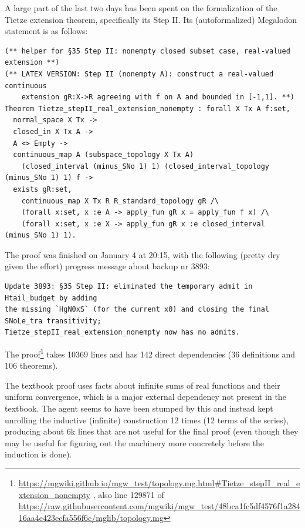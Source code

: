 \documentclass[a4paper,UKenglish,cleveref, autoref, thm-restate]{lipics-v2021}
\begin{document}
A large part of the last two days has been spent on the formalization
of the Tietze extension theorem, specifically its Step II. Its (autoformalized) Megalodon statement is as follows:
\begin{small}
\begin{verbatim}
(** helper for §35 Step II: nonempty closed subset case, real-valued extension **)
(** LATEX VERSION: Step II (nonempty A): construct a real-valued continuous
    extension gR:X->R agreeing with f on A and bounded in [-1,1]. **)
Theorem Tietze_stepII_real_extension_nonempty : forall X Tx A f:set,
  normal_space X Tx ->
  closed_in X Tx A ->
  A <> Empty ->
  continuous_map A (subspace_topology X Tx A)
    (closed_interval (minus_SNo 1) 1) (closed_interval_topology (minus_SNo 1) 1) f ->
  exists gR:set,
    continuous_map X Tx R R_standard_topology gR /\
    (forall x:set, x :e A -> apply_fun gR x = apply_fun f x) /\
    (forall x:set, x :e X -> apply_fun gR x :e closed_interval (minus_SNo 1) 1).
\end{verbatim}
\end{small}  
The proof was finished on January 4 at 20:15, with the following (pretty dry given the effort) progress message about backup nr 3893:
\begin{small}
\begin{verbatim}
Update 3893: §35 Step II: eliminated the temporary admit in Htail_budget by adding
the missing `HgN0xS` (for the current x0) and closing the final SNoLe_tra transitivity;
Tietze_stepII_real_extension_nonempty now has no admits.
\end{verbatim}
\end{small}
The proof\footnote{\url{https://mgwiki.github.io/mgw_test/topology.mg.html\#Tietze_stepII_real_extension_nonempty} , also line 129871 of \url{https://raw.githubusercontent.com/mgwiki/mgw_test/48bca1fc5df4576f1a28416aa4e423ecfa556f6c/mglib/topology.mg}} takes 10369 lines and has 142 direct dependencies (36 definitions and 106 theorems).
%
%
  
%

The textbook proof uses
facts about infinite sums of real functions and their uniform
convergence, which is a major external dependency not present in the
textbook. The agent seems to have been stumped by this and instead
kept unrolling the inductive (infinite) construction 12 times (12
terms of the series), producing about 6k lines that are not useful for
the final proof (even though they may be useful for figuring out the
machinery more concretely before the induction is done).
\end{document}
